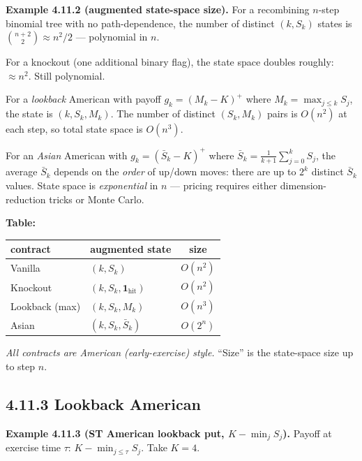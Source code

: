 \documentclass[
  10pt,
  twoside]{book}
\newcounter{none} %
\begin{document}
\textbf{Example 4.11.2 (augmented state-space size).} For a recombining
\(n\)-step binomial tree with no path-dependence, the number of distinct
\((k, S_k)\) states is \(\binom{n+2}{2} \approx n^2/2\) --- polynomial
in \(n\).

For a knockout (one additional binary flag), the state space doubles
roughly: \(\approx n^2\). Still polynomial.

For a \emph{lookback} American with payoff \(g_k = (M_k - K)^+\) where
\(M_k = \max_{j \le k} S_j\), the state is \((k, S_k, M_k)\). The number
of distinct \((S_k, M_k)\) pairs is \(O(n^2)\) at each step, so total
state space is \(O(n^3)\).

For an \emph{Asian} American with \(g_k = (\bar S_k - K)^+\) where
\(\bar S_k = \frac{1}{k+1}\sum_{j=0}^k S_j\), the average \(\bar S_k\)
depends on the \emph{order} of up/down moves: there are up to \(2^k\)
distinct \(\bar S_k\) values. State space is \emph{exponential} in \(n\)
--- pricing requires either dimension-reduction tricks or Monte Carlo.

\textbf{Table:}

{\def\LTcaptype{none} %
\begin{table}[H]
\centering
\begin{tabular}{|l|l|c|}
\toprule
contract & augmented state & size \\
\midrule



Vanilla & \((k, S_k)\) & \(O(n^2)\) \\
Knockout & \((k, S_k, \mathbf{1}_{\text{hit}})\) & \(O(n^2)\) \\
Lookback (max) & \((k, S_k, M_k)\) & \(O(n^3)\) \\
Asian & \((k, S_k, \bar S_k)\) & \(O(2^n)\) \\
\bottomrule
\end{tabular}
\end{table}
}

\emph{All contracts are American (early-exercise) style.} ``Size'' is
the state-space size up to step \(n\).

\subsection{4.11.3 Lookback American}\label{lookback-american}

\textbf{Example 4.11.3 (ST American lookback put,
\(K - \min_{j} S_j\)).} Payoff at exercise time \(\tau\):
\(K - \min_{j \le \tau} S_j\). Take \(K = 4\).
\end{document}
